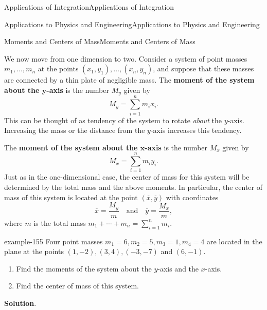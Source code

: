 \documentclass[10pt,]{book}
\newcommand{\terminology}[1]{\textbf{#1}}
\numberwithin{equation}{section}
\begin{document}
\begin{chapterptx}{Applications of Integration}{}{Applications of Integration}{}{}
\begin{sectionptx}{Applications to Physics and Engineering}{}{Applications to Physics and Engineering}{}{}
\begin{subsectionptx}{Moments and Centers of Mass}{}{Moments and Centers of Mass}{}{}
\begin{figure}
{
}
\end{figure}
\hypertarget{p-698}{}%
We now move from one dimension to two. Consider a system of point masses \(m_{1},\ldots,m_{n}\) at the points \((x_{1},y_{1}),\ldots,(x_{n},y_{n})\), and suppose that these masses are connected by a thin plate of negligible mass. The \terminology{moment of the system about the \(\boldsymbol{y}\)-axis} is the number \(M_{y}\) given by%
%
\begin{equation*}
M_{y} = \sum_{i=1}^{n}m_{i}x_{i}.
\end{equation*}
\hypertarget{p-699}{}%
This can be thought of as tendency of the system to rotate \emph{about} the \(y\)-axis. Increasing the mass or the distance from the \(y\)-axis increases this tendency.%
\par
\hypertarget{p-700}{}%
The \terminology{moment of the system about the \(\boldsymbol{x}\)-axis} is the number \(M_{x}\) given by%
\begin{equation*}
M_{x} = \sum_{i=1}^{n}m_{i}y_{i}.
\end{equation*}
Just as in the one-dimensional case, the center of mass for this system will be determined by the total mass and the above moments. In particular, the center of mass of this system is located at the point \((\overline{x},\overline{y})\) with coordinates%
\begin{equation*}
\overline{x} = \frac{M_{y}}{m}\quad\text{and}\quad\overline{y} = \frac{M_{x}}{m},
\end{equation*}
where \(m\) is the total mass \(m_{1}+\cdots+m_{n} = \sum_{i=1}^{n}m_{i}\).%
\begin{example}{}{example-155}%
\hypertarget{p-701}{}%
Four point masses \(m_{1} = 6,m_{2} = 5,m_{3} = 1,m_{4} = 4\) are located in the plane at the points \((1,-2),(3,4),(-3,-7)\) and \((6,-1)\). \leavevmode%
\begin{enumerate}
\item\hypertarget{li-59}{}\hypertarget{p-702}{}%
Find the moments of the system about the \(y\)-axis and the \(x\)-axis.%
\item\hypertarget{li-60}{}\hypertarget{p-703}{}%
Find the center of mass of this system.%
\end{enumerate}
%
\par\smallskip%
\noindent\textbf{Solution}.\hypertarget{solution-151}{}\quad%
\leavevmode%
\begin{enumerate}

\end{enumerate}
\end{example}
\end{subsectionptx}
\end{sectionptx}
\end{chapterptx}
\end{document}
